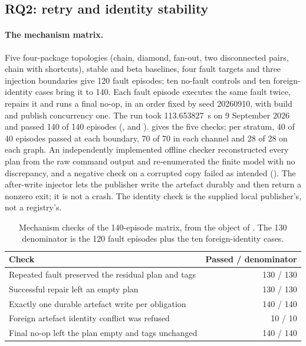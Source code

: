 \subsection{RQ2: retry and identity stability}
\label{sec:eval:rq2}

\paragraph{The mechanism matrix.} Five four-package topologies (chain,
diamond, fan-out, two disconnected pairs, chain with shortcuts), stable and
beta baselines, four fault targets and three injection boundaries give 120
fault episodes; ten no-fault controls and ten foreign-identity cases bring it
to 140. Each fault episode executes the same fault twice, repairs it and runs
a final no-op, in an order fixed by seed 20260910, with build and publish
concurrency one. The run took 113.653827~s on 9 September 2026 and passed 140
of 140 episodes (,  and ).
 gives the five checks; per stratum, 40 of 40
episodes passed at each boundary, 70 of 70 in each channel and 28 of 28 on
each graph. An independently implemented offline checker reconstructed every
plan from the raw command output and re-enumerated the finite model with no
discrepancy, and a negative check on a corrupted copy failed as intended
(). The after-write injector lets the publisher write the
artefact durably and then return a nonzero exit; it is not a crash. The
identity check is the supplied local publisher's, not a registry's.

\begin{table}[ht]
\centering\footnotesize
\caption{Mechanism checks of the 140-episode matrix, from the
 object of
\protect{}.
The 130 denominator is the 120 fault episodes plus the ten foreign-identity
cases.}
\label{tab:eval:mechanism}
\begin{tabular}{@{}L{9cm}r@{}}
\toprule
Check & Passed / denominator \\
\midrule
Repeated fault preserved the residual plan and tags & 130 / 130 \\
Successful repair left an empty plan & 130 / 130 \\
Exactly one durable artefact write per obligation & 140 / 140 \\
Foreign artefact identity conflict was refused & 10 / 10 \\
Final no-op left the plan empty and tags unchanged & 140 / 140 \\
\bottomrule
\end{tabular}
\end{table}

